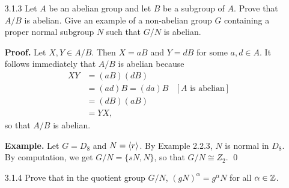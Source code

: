 \begin{enumerate}
      \textbf{Proof.} Let $Z = XY$ (i.e., $Z$ is the fiber over $ab$) and fix
      $w \in Z$. We have that
      \begin{align*}
         \varphi(u^{-1}w) &= \varphi(u^{-1})\varphi(w) \\
            &= \varphi(u)^{-1}\varphi(w) &[\text{Proposition 1}] \\
            &= a^{-1}(ab) = (a^{-1}a)b = b,
      \end{align*}
      so that $u^{-1}w \in Y$. Since $u(u^{-1}w) = w$, we let $v = u^{-1}w$.\qed
   \item[3.1.3]   Let $A$ be an abelian group and let $B$ be a subgroup of $A$.
                  Prove that $A/B$ is abelian. Give an example of a non-abelian
                  group $G$ containing a proper normal subgroup $N$ such that
                  $G/N$ is abelian.

      \textbf{Proof.} Let $X, Y \in A/B$. Then $X = aB$ and $Y = dB$ for some
      $a, d \in A$. It follows immediately that $A/B$ is abelian because
      \begin{align*}
         XY &= (aB)(dB) \\
            &= (ad)B = (da)B &[A\text{ is abelian}] \\
            &= (dB)(aB) \\
            &= YX,
      \end{align*}
      so that $A/B$ is abelian.

      \textbf{Example.} Let $G = D_8$ and $N = \langle r \rangle$. By Example 2.2.3, $N$
      is normal in $D_8$. By computation, we get $G/N = \{sN, N\}$, so that
      $G/N \cong Z_2$. \qed
   \item[3.1.4]   Prove that in the quotient group $G/N$,
                  $(gN)^\alpha = g^\alpha N$ for all $\alpha \in \mathbb{Z}$.


\end{enumerate}
